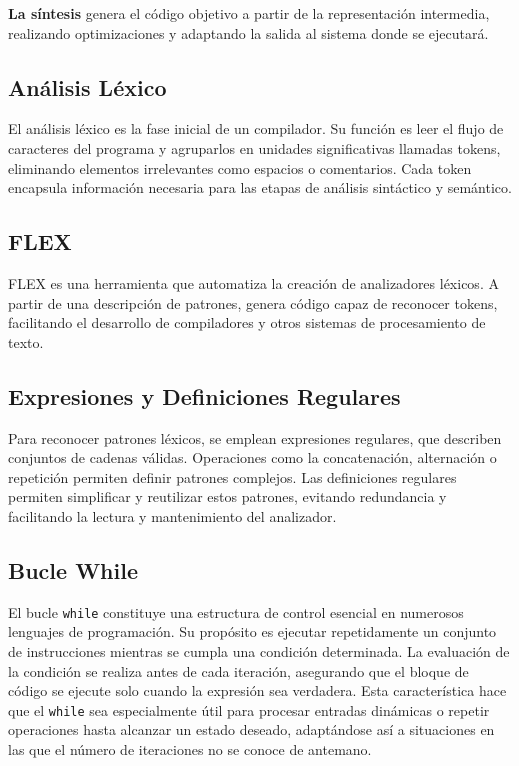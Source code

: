 \documentclass{article}
\begin{document}
\textbf{La síntesis} genera el código objetivo a partir de la representación intermedia, realizando optimizaciones y adaptando la salida al sistema donde se ejecutará.

\subsection*{Análisis Léxico}

El análisis léxico es la fase inicial de un compilador. Su función es leer el flujo de caracteres del programa y agruparlos en unidades significativas llamadas tokens, eliminando elementos irrelevantes como espacios o comentarios. Cada token encapsula información necesaria para las etapas de análisis sintáctico y semántico.

\subsection*{FLEX}

FLEX es una herramienta que automatiza la creación de analizadores léxicos. A partir de una descripción de patrones, genera código capaz de reconocer tokens, facilitando el desarrollo de compiladores y otros sistemas de procesamiento de texto.

\subsection*{Expresiones y Definiciones Regulares}

Para reconocer patrones léxicos, se emplean expresiones regulares, que describen conjuntos de cadenas válidas. Operaciones como la concatenación, alternación o repetición permiten definir patrones complejos. Las definiciones regulares permiten simplificar y reutilizar estos patrones, evitando redundancia y facilitando la lectura y mantenimiento del analizador.

\subsection*{Bucle While}

El bucle \texttt{while} constituye una estructura de control esencial en numerosos lenguajes de programación. Su propósito es ejecutar repetidamente un conjunto de instrucciones mientras se cumpla una condición determinada. La evaluación de la condición se realiza antes de cada iteración, asegurando que el bloque de código se ejecute solo cuando la expresión sea verdadera. Esta característica hace que el \texttt{while} sea especialmente útil para procesar entradas dinámicas o repetir operaciones hasta alcanzar un estado deseado, adaptándose así a situaciones en las que el número de iteraciones no se conoce de antemano.
\end{document}
